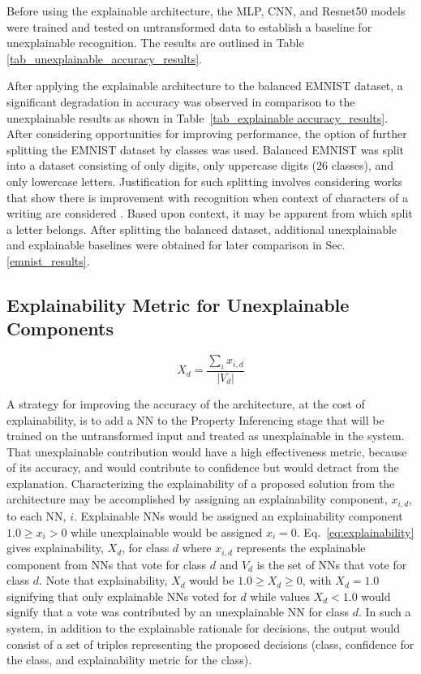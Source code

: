 \documentclass[conference]{IEEEtran}
\begin{document}
Before using the explainable architecture, the MLP, CNN, and Resnet50 models were
trained and tested on untransformed data to establish a baseline for
unexplainable recognition.  The results are outlined in Table
\ref{tab_unexplainable_accuracy_results}.

After applying the explainable architecture to the balanced EMNIST dataset, a
significant degradation in accuracy was observed in comparison to the
unexplainable results as shown in Table~\ref{tab_explainable accuracy_results}.
After considering opportunities for improving performance, the option of further
splitting the EMNIST dataset by classes was used.  Balanced EMNIST was split
into a dataset consisting of only digits, only uppercase digits (26 classes),
and only lowercase letters.  Justification for such splitting involves
considering works that show there is improvement with recognition when context
of characters of a writing are considered \cite{506792}.  Based upon context, it
may be apparent from which split a letter belongs. After splitting the balanced
dataset, additional unexplainable and explainable baselines were obtained for
later comparison in Sec. \ref{emnist_results}.

\subsection{Explainability Metric for Unexplainable Components}
\label{method:metric}

\begin{equation}
    X_d=\frac{\sum_i x_{i,d}}{|V_d|}
    \label{eq:explainability}
\end{equation}

A strategy for improving the accuracy of the architecture, at the cost of
explainability, is to add a NN to the Property Inferencing stage that will be
trained on the untransformed input and treated as unexplainable in the system.
That unexplainable contribution would have a high effectiveness metric, because
of its accuracy, and would contribute to confidence but would detract from the
explanation.  Characterizing the explainability of a proposed solution from the
architecture may be accomplished by assigning an explainability component,
$x_{i,d}$, to each NN, $i$.  Explainable NNs would be assigned an explainability
component $1.0 \geq x_i > 0$ while unexplainable would be assigned $x_i = 0$.
Eq.~\ref{eq:explainability} gives explainability, $X_d$, for class $d$ where
$x_{i,d}$ represents the explainable component from NNs that vote for class $d$
and $V_d$ is the set of NNs that vote for class $d$.  Note that explainability,
$X_d$ would be $1.0 \geq X_d \geq 0$, with $X_d = 1.0$ signifying that only
explainable NNs voted for $d$ while values $X_d < 1.0$ would signify that a vote
was contributed by an unexplainable NN for class $d$.  In such a system, in
addition to the explainable rationale for decisions, the output would consist of
a set of triples representing the proposed decisions (class, confidence for the
class, and explainability metric for the class).
\end{document}
